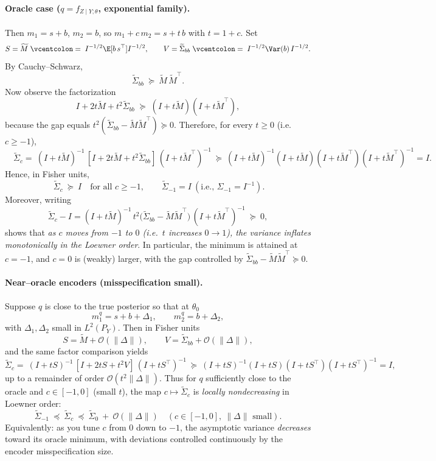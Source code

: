 \paragraph{Oracle case ($q=f_{Z\mid Y;\theta}$, exponential family).}
Then \(m_1=s+b\), \(m_2=b\), so \(m_1+c\,m_2=s+t\,b\) with \(t=1+c\).
Set
\[
S=\widetilde M\;\vcentcolon=\;I^{-1/2}\E[b\,s^\top]I^{-1/2},
\qquad
V=\widetilde\Sigma_{bb}\;\vcentcolon=\;I^{-1/2}\Var(b)\,I^{-1/2}.
\]
By Cauchy–Schwarz,
\[
\boxed{\quad \widetilde\Sigma_{bb}\ \succeq\ \widetilde M\,\widetilde M^\top. \quad}
\]
Now observe the factorization
\[
I+2t\widetilde M+t^2\widetilde\Sigma_{bb}
\;\succeq\;
(I+t\widetilde M)(I+t\widetilde M^\top),
\]
because the gap equals \(t^2(\widetilde\Sigma_{bb}-\widetilde M\widetilde M^\top)\succeq 0\).
Therefore, for every \(t\ge 0\) (i.e. \(c\ge -1\)),
\[
\boxed{\quad
\widetilde\Sigma_c
=\ (I+t\widetilde M)^{-1}\,[I+2t\widetilde M+t^2\widetilde\Sigma_{bb}]\,(I+t\widetilde M^\top)^{-1}
\ \succeq\
(I+t\widetilde M)^{-1}(I+t\widetilde M)(I+t\widetilde M^\top)(I+t\widetilde M^\top)^{-1}
= I.
\quad}
\]
Hence, in Fisher units,
\[
\boxed{\ \ \widetilde\Sigma_c\ \succeq\ I\quad\text{for all }c\ge -1,\qquad
\widetilde\Sigma_{-1}=I\ (\text{i.e., } \Sigma_{-1}=I^{-1}).\ }
\]
Moreover, writing
\[
\widetilde\Sigma_c - I
=(I+t\widetilde M)^{-1}\,t^2\big(\widetilde\Sigma_{bb}-\widetilde M\widetilde M^\top\big)\,(I+t\widetilde M^\top)^{-1}
\ \succeq\ 0,
\]
shows that \emph{as \(c\) moves from \(-1\) to \(0\) (i.e.\ $t$ increases $0\to 1$), the
variance inflates monotonically in the Loewner order}. In particular, the minimum is attained at \(c=-1\), and \(c=0\) is (weakly) larger, with the gap controlled by \(\widetilde\Sigma_{bb}-\widetilde M\widetilde M^\top\succeq 0\).

\paragraph{Near–oracle encoders (misspecification small).}
Suppose \(q\) is close to the true posterior so that at \(\theta_0\)
\[
m_1^q=s+b+\Delta_1,\qquad m_2^q=b+\Delta_2,
\]
with \(\Delta_1,\Delta_2\) small in \(L^2(P_Y)\). Then in Fisher units
\[
S=\widetilde M + \mathcal O(\|\Delta\|),\qquad
V=\widetilde\Sigma_{bb} + \mathcal O(\|\Delta\|),
\]
and the same factor comparison yields
\[
\widetilde\Sigma_c
=\ (I+tS)^{-1}\,[I+2tS+t^2V]\,(I+tS^\top)^{-1}
\ \succeq\
(I+tS)^{-1}(I+tS)(I+tS^\top)(I+tS^\top)^{-1}
= I,
\]
up to a remainder of order \(\mathcal O(t^2\|\Delta\|)\). Thus for \(q\) sufficiently close to the oracle and \(c\in[-1,0]\) (small \(t\)), the map \(c\mapsto \widetilde\Sigma_c\) is \emph{locally nondecreasing} in Loewner order:
\[
\boxed{\quad
\widetilde\Sigma_{-1}\ \preceq\ \widetilde\Sigma_c\ \preceq\ \widetilde\Sigma_0
\ +\ \mathcal O(\|\Delta\|)\quad (c\in[-1,0],\ \|\Delta\|\text{ small}).\quad}
\]
Equivalently: as you tune \(c\) from \(0\) down to \(-1\), the asymptotic variance \emph{decreases} toward its oracle minimum, with deviations controlled continuously by the encoder misspecification size.

